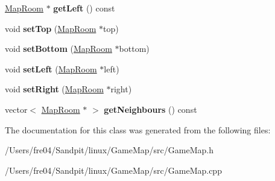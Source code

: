 \begin{DoxyCompactItemize}
\item 
\hypertarget{class_map_room_a404986300d119e1f346b55525572ea4f}{}\hyperlink{class_map_room}{Map\+Room} $\ast$ {\bfseries get\+Left} () const \label{class_map_room_a404986300d119e1f346b55525572ea4f}

\item 
\hypertarget{class_map_room_af57119d61a084999e0edc062805cf04e}{}void {\bfseries set\+Top} (\hyperlink{class_map_room}{Map\+Room} $\ast$top)\label{class_map_room_af57119d61a084999e0edc062805cf04e}

\item 
\hypertarget{class_map_room_a585ce91a6cd6ca9d777a37f10e1325c8}{}void {\bfseries set\+Bottom} (\hyperlink{class_map_room}{Map\+Room} $\ast$bottom)\label{class_map_room_a585ce91a6cd6ca9d777a37f10e1325c8}

\item 
\hypertarget{class_map_room_ab20d7e94132cf6647def1a21e008b451}{}void {\bfseries set\+Left} (\hyperlink{class_map_room}{Map\+Room} $\ast$left)\label{class_map_room_ab20d7e94132cf6647def1a21e008b451}

\item 
\hypertarget{class_map_room_a59ac5cff02bec0c79f777cf3ba695c80}{}void {\bfseries set\+Right} (\hyperlink{class_map_room}{Map\+Room} $\ast$right)\label{class_map_room_a59ac5cff02bec0c79f777cf3ba695c80}

\item 
\hypertarget{class_map_room_a614369664cf7ea75c246f5b5d9d281d6}{}vector$<$ \hyperlink{class_map_room}{Map\+Room} $\ast$ $>$ {\bfseries get\+Neighbours} () const \label{class_map_room_a614369664cf7ea75c246f5b5d9d281d6}

\end{DoxyCompactItemize}


The documentation for this class was generated from the following files\+:\begin{DoxyCompactItemize}
\item 
/\+Users/fre04/\+Sandpit/linux/\+Game\+Map/src/Game\+Map.\+h\item 
/\+Users/fre04/\+Sandpit/linux/\+Game\+Map/src/Game\+Map.\+cpp\end{DoxyCompactItemize}
